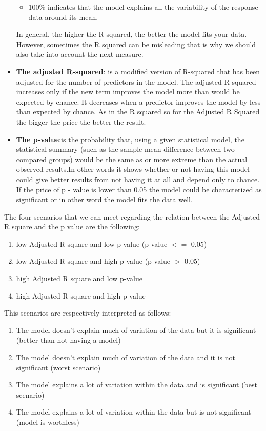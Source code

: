 \documentclass{article}
\begin{document}
\begin{itemize}
\begin{itemize}
\item 100\% indicates that the model explains all the variability of the response data around its mean.
\end{itemize}
In general, the higher the R-squared, the better the model fits your data. However, sometimes the R squared can be misleading that is why we should also take into account the next measure.
\item \textbf{The adjusted R-squared}: is a modified version of R-squared that has been adjusted for the number of predictors in the model. The adjusted R-squared increases only if the new term improves the model more than would be expected by chance. It decreases when a predictor improves the model by less than expected by chance. As in the R squared so for the Adjusted R Squared the bigger the price the better the result.
\item \textbf{The p-value}:is the probability that, using a given statistical model, the statistical summary (such as the sample mean difference between two compared groups) would be the same as or more extreme than the actual observed results.In other words it shows whether or not having this model could give better results from not having it at all and depend only to chance. If the price of p - value is lower than 0.05 the model could be characterized as significant or in other word the model fits the data well.
\end{itemize}  
The four scenarios that we can meet regarding the relation between the Adjusted R square and the p value are the following:
\begin{enumerate}
\item low Adjusted R square and low p-value (p-value $<=$ 0.05)
\item low Adjusted R square and high p-value (p-value $>$ 0.05)
\item high Adjusted R square and low p-value
\item high Adjusted R square and high p-value
\end{enumerate}
This scenarios are respectively interpreted as follows:
\begin{enumerate}
\item The model doesn't explain much of variation of the data but it is significant (better than not having a model)
\item The model doesn't explain much of variation of the data and it is not significant (worst scenario)
\item The model explains a lot of variation within the data and is significant (best scenario)
\item The model explains a lot of variation within the data but is not significant (model is worthless)
\end{enumerate}
\end{document}
